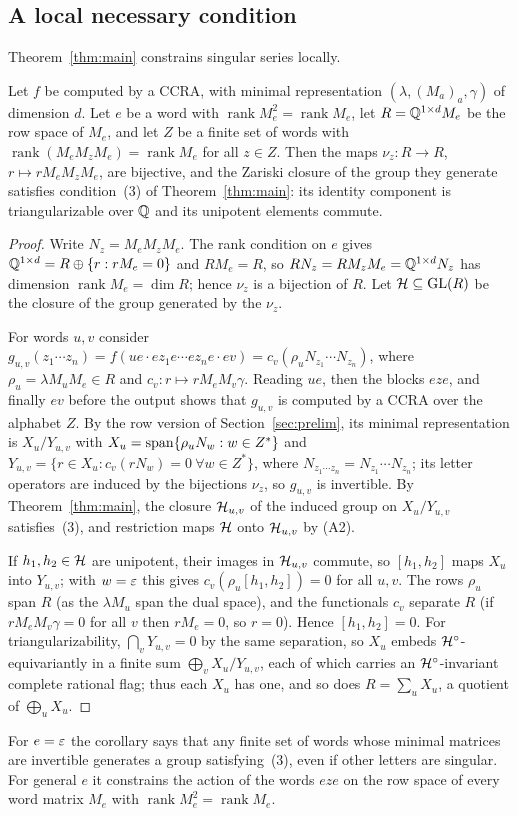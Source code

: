 \subsection{A local necessary condition}\label{ssec:local}
Theorem~\ref{thm:main} constrains singular series locally.
\begin{corollary}\label{cor:local}
Let $f$ be computed by a CCRA, with minimal representation $(\lambda,(M_a)_a,\gamma)$ of dimension $d$. Let $e$ be a word with $\operatorname{rank}M_e^2=\operatorname{rank}M_e$, let $R=\mathbb{Q}^{1\times d}M_e$ be the row space of $M_e$, and let $Z$ be a finite set of words with $\operatorname{rank}(M_eM_zM_e)=\operatorname{rank}M_e$ for all $z\in Z$. Then the maps $\nu_z:R\to R$, $r\mapsto rM_eM_zM_e$, are bijective, and the Zariski closure of the group they generate satisfies condition~(3) of Theorem~\ref{thm:main}: its identity component is triangularizable over $\mathbb{Q}$ and its unipotent elements commute.
\end{corollary}
\begin{proof}
Write $N_z=M_eM_zM_e$. The rank condition on $e$ gives $\mathbb{Q}^{1\times d}=R\oplus\{r:rM_e=0\}$ and $RM_e=R$, so $RN_z=RM_zM_e=\mathbb{Q}^{1\times d}N_z$ has dimension $\operatorname{rank}M_e=\dim R$; hence $\nu_z$ is a bijection of $R$. Let $\mathcal{H}\subseteq\mathrm{GL}(R)$ be the closure of the group generated by the $\nu_z$.

For words $u,v$ consider $g_{u,v}(z_1\cdots z_n)=f(ue\cdot ez_1e\cdots ez_ne\cdot ev)=c_v(\rho_uN_{z_1}\cdots N_{z_n})$, where $\rho_u=\lambda M_uM_e\in R$ and $c_v:r\mapsto rM_eM_v\gamma$. Reading $ue$, then the blocks $eze$, and finally $ev$ before the output shows that $g_{u,v}$ is computed by a CCRA over the alphabet $Z$. By the row version of Section~\ref{sec:prelim}, its minimal representation is $X_u/Y_{u,v}$ with $X_u=\operatorname{span}\{\rho_uN_w:w\in Z^*\}$ and $Y_{u,v}=\{r\in X_u:c_v(rN_w)=0\ \forall w\in Z^*\}$, where $N_{z_1\cdots z_n}=N_{z_1}\cdots N_{z_n}$; its letter operators are induced by the bijections $\nu_z$, so $g_{u,v}$ is invertible. By Theorem~\ref{thm:main}, the closure $\mathcal{H}_{u,v}$ of the induced group on $X_u/Y_{u,v}$ satisfies~(3), and restriction maps $\mathcal{H}$ onto $\mathcal{H}_{u,v}$ by (A2).

If $h_1,h_2\in\mathcal{H}$ are unipotent, their images in $\mathcal{H}_{u,v}$ commute, so $[h_1,h_2]$ maps $X_u$ into $Y_{u,v}$; with $w=\varepsilon$ this gives $c_v(\rho_u[h_1,h_2])=0$ for all $u,v$. The rows $\rho_u$ span $R$ (as the $\lambda M_u$ span the dual space), and the functionals $c_v$ separate $R$ (if $rM_eM_v\gamma=0$ for all $v$ then $rM_e=0$, so $r=0$). Hence $[h_1,h_2]=0$. For triangularizability, $\bigcap_vY_{u,v}=0$ by the same separation, so $X_u$ embeds $\mathcal{H}^\circ$-equivariantly in a finite sum $\bigoplus_vX_u/Y_{u,v}$, each of which carries an $\mathcal{H}^\circ$-invariant complete rational flag; thus each $X_u$ has one, and so does $R=\sum_uX_u$, a quotient of $\bigoplus_uX_u$.
\end{proof}
For $e=\varepsilon$ the corollary says that any finite set of words whose minimal matrices are invertible generates a group satisfying~(3), even if other letters are singular. For general $e$ it constrains the action of the words $eze$ on the row space of every word matrix $M_e$ with $\operatorname{rank}M_e^2=\operatorname{rank}M_e$.

